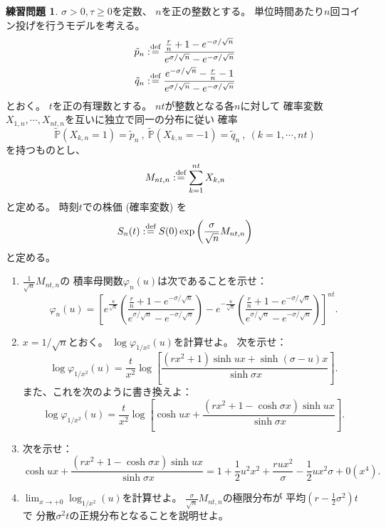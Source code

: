 \documentclass[uplatex]{jsarticle}
\theoremstyle{definition}
\newtheorem{prob}[prob]{練習問題}
\def\P{\mathbb{P}}
\def\dfn{:\overset{\mbox{{\scriptsize def}}}{=}}
\begin{document}
\begin{prob}\label{prob: 3.8}
  \(\sigma > 0, \tau \geq 0\)を定数、
  \(n\)を正の整数とする。
  単位時間あたり\(n\)回コイン投げを行うモデルを考える。
  \begin{align*}
    \tilde{p}_n &\dfn
    \frac{\frac{r}{n} + 1 - e^{-\sigma/\sqrt{n}}}
    {e^{\sigma/\sqrt{n}}-e^{-\sigma/\sqrt{n}}} \\
    \tilde{q}_n &\dfn
    \frac{e^{-\sigma/\sqrt{n}} - \frac{r}{n} - 1}
    {e^{\sigma/\sqrt{n}}-e^{-\sigma/\sqrt{n}}} \\
  \end{align*}
  とおく。
  \(t\)を正の有理数とする。
  \(nt\)が整数となる各\(n\)に対して
  確率変数\(X_{1,n}, \cdots ,X_{nt,n}\)を互いに独立で同一の分布に従い
  確率
  \[
  \tilde{\P}(X_{k,n} = 1) = \tilde{p}_n \ , \
  \tilde{\P}(X_{k,n} = -1) = \tilde{q}_n \ , \
  (k=1,\cdots ,nt)
  \]
  を持つものとし、
  \[M_{nt,n} \dfn \sum_{k=1}^{nt} X_{k,n}\]
  と定める。
  時刻\(t\)での株価 (確率変数) を
  \[
  S_n(t) \dfn S(0)\exp\left( \frac{\sigma}{\sqrt{n}}M_{nt,n} \right)
  \]
  と定める。
  \begin{enumerate}
    \item \label{enumi: 3.8-1}
    \(\frac{1}{\sqrt{n}}M_{nt,n}\)の
    積率母関数\(\varphi_n(u)\)は次であることを示せ：
    \[
    \varphi_n(u) =
    \left[
    e^{\frac{u}{\sqrt{n}}}
    \left(
    \frac{\frac{r}{n} + 1 - e^{-\sigma/\sqrt{n}}}
    {e^{\sigma/\sqrt{n}} - e^{-\sigma/\sqrt{n}}}
    \right)
    - e^{-\frac{u}{\sqrt{n}}}
    \left(
    \frac{\frac{r}{n} + 1 - e^{-\sigma/\sqrt{n}}}
    {e^{\sigma/\sqrt{n}} - e^{-\sigma/\sqrt{n}}}
    \right)
    \right] ^{nt}.
    \]
    \item \label{enumi: 3.8-2}
    \(x = 1/\sqrt{n}\)とおく。
    \(\log \varphi_{1/x^2}(u)\)を計算せよ。
    次を示せ：
    \[
    \log\varphi_{1/x^2}(u) =
    \frac{t}{x^2}\log \left[
    \frac{(rx^2+1)\sinh ux + \sinh(\sigma-u) x}
    {\sinh \sigma x}
    \right].
    \]
    また、これを次のように書き換えよ：
    \[
    \log\varphi_{1/x^2}(u) =
    \frac{t}{x^2}\log \left[ \cosh ux +
    \frac{(rx^2+1 - \cosh \sigma x)\sinh ux}
    {\sinh \sigma x}
    \right].
    \]
    \item \label{enumi: 3.8-3}
    次を示せ：
    \[
    \cosh ux + \frac{(rx^2+1 - \cosh\sigma x)\sinh ux}{\sinh\sigma x}
    = 1 + \frac{1}{2}u^2x^2 + \frac{rux^2}{\sigma} - \frac{1}{2}ux^2\sigma
    + 0(x^4).
    \]
    \item \label{enumi: 3.8-4}
    \(\lim_{x\to +0}\log_{1/x^2}(u)\)を計算せよ。
    \(\frac{\sigma}{\sqrt{n}}M_{nt,n}\)の極限分布が
    平均\((r-\frac{1}{2}\sigma^2)t\)で
    分散\(\sigma^2t\)の正規分布となることを説明せよ。
  \end{enumerate}
\end{prob}
\end{document}
